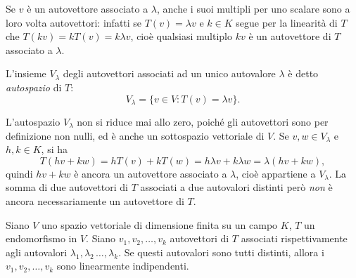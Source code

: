 Se $v$ è un autovettore associato a $\lambda$, anche i suoi multipli per uno scalare sono a loro volta autovettori: infatti se $T(v)=\lambda v$ e $k\in K$ segue per la linearità di $T$ che $T(kv)=kT(v)=k\lambda v$, cioè qualsiasi multiplo $kv$ è un autovettore di $T$ associato a $\lambda$.
\begin{definizione} \label{d:autospazio}
	L'insieme $V_\lambda$ degli autovettori associati ad un unico autovalore $\lambda$ è detto \emph{autospazio} di $T$:
	\begin{equation*}
	V_\lambda=\{v\in V\colon T(v)=\lambda v\}.
	\end{equation*}
\end{definizione}
L'autospazio $V_\lambda$ non si riduce mai allo zero, poiché gli autovettori sono per definizione non nulli, ed è anche un sottospazio vettoriale di $V$.
Se $v,w\in V_\lambda$ e $h,k\in K$, si ha
\begin{equation*}
	T(hv+kw)=hT(v)+kT(w)=h\lambda v+k\lambda w=\lambda(hv+kw),
\end{equation*}
quindi $hv+kw$ è ancora un autovettore associato a $\lambda$, cioè appartiene a $V_\lambda$.
La somma di due autovettori di $T$ associati a due autovalori distinti però \emph{non} è ancora necessariamente un autovettore di $T$.
\begin{teorema} \label{t:autovettori-linearmente-indipendenti}
	Siano $V$ uno spazio vettoriale di dimensione finita su un campo $K$, $T$ un endomorfismo in $V$. Siano $v_1,v_2,\dots,v_k$ autovettori di $T$ associati rispettivamente agli autovalori $\lambda_1,\lambda_2\,\dots,\lambda_k$. Se questi autovalori sono tutti distinti, allora i $v_1,v_2,\dots,v_k$ sono linearmente indipendenti.
\end{teorema}
